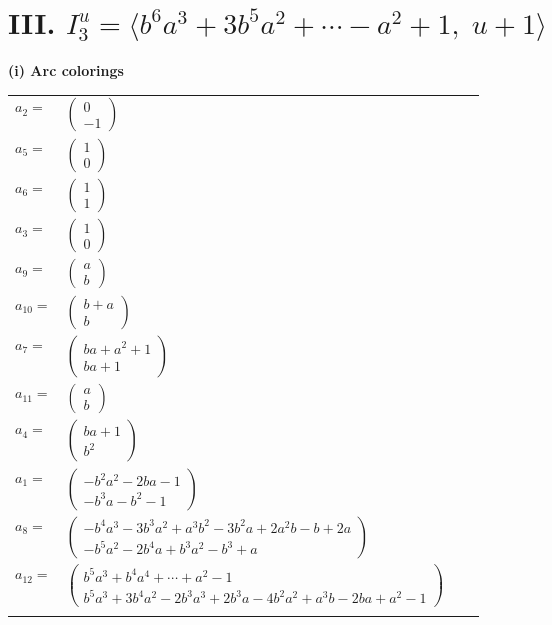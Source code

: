 \documentclass[1p]{elsarticle_modified}
\theoremstyle{definition}
\begin{document}
\centering \section*{III. $I^u_{3}= \langle b^6 a^3+3 b^5 a^2+\cdots- a^2+1,\;u+1 \rangle$}
\flushleft \textbf{(i) Arc colorings}\\
\begin{tabular}{m{7pt} m{180pt} m{7pt} m{180pt} }
\flushright $a_{2}=$&$\begin{pmatrix}0\\-1\end{pmatrix}$ \\
\flushright $a_{5}=$&$\begin{pmatrix}1\\0\end{pmatrix}$ \\
\flushright $a_{6}=$&$\begin{pmatrix}1\\1\end{pmatrix}$ \\
\flushright $a_{3}=$&$\begin{pmatrix}1\\0\end{pmatrix}$ \\
\flushright $a_{9}=$&$\begin{pmatrix}a\\b\end{pmatrix}$ \\
\flushright $a_{10}=$&$\begin{pmatrix}b+a\\b\end{pmatrix}$ \\
\flushright $a_{7}=$&$\begin{pmatrix}b a+a^2+1\\b a+1\end{pmatrix}$ \\
\flushright $a_{11}=$&$\begin{pmatrix}a\\b\end{pmatrix}$ \\
\flushright $a_{4}=$&$\begin{pmatrix}b a+1\\b^2\end{pmatrix}$ \\
\flushright $a_{1}=$&$\begin{pmatrix}- b^2 a^2-2 b a-1\\- b^3 a- b^2-1\end{pmatrix}$ \\
\flushright $a_{8}=$&$\begin{pmatrix}- b^4 a^3-3 b^3 a^2+a^3 b^2-3 b^2 a+2 a^2 b- b+2 a\\- b^5 a^2-2 b^4 a+b^3 a^2- b^3+a\end{pmatrix}$ \\
\flushright $a_{12}=$&$\begin{pmatrix}b^5 a^3+b^4 a^4+\cdots+a^2-1\\b^5 a^3+3 b^4 a^2-2 b^3 a^3+2 b^3 a-4 b^2 a^2+a^3 b-2 b a+a^2-1\end{pmatrix}$\\&\end{tabular}
\end{document}
